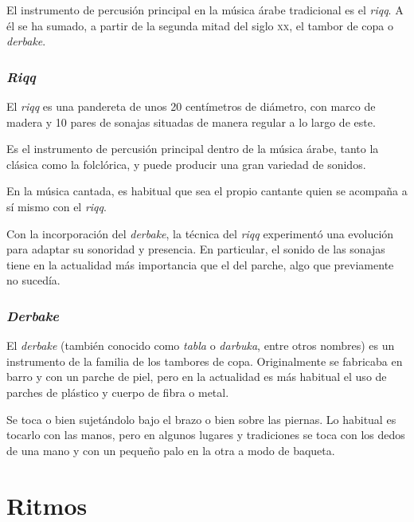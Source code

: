         El instrumento de percusión principal en la música árabe tradicional es el \emph{riqq}. A él se ha sumado, a partir de la segunda mitad del siglo \textsc{xx}, el tambor de copa o \emph{derbake}.

        \subsubsection{\emph{Riqq}}

        El \emph{riqq} es una pandereta de unos 20 centímetros de diámetro, con marco de madera y 10 pares de sonajas situadas de manera regular a lo largo de este.

        Es el instrumento de percusión principal dentro de la música árabe, tanto la clásica como la folclórica, y puede producir una gran variedad de sonidos.

        En la música cantada, es habitual que sea el propio cantante quien se acompaña a sí mismo con el \emph{riqq}.

        Con la incorporación del \emph{derbake}, la técnica del \emph{riqq} experimentó una evolución para adaptar su sonoridad y presencia. En particular, el sonido de las sonajas tiene en la actualidad más importancia que el del parche, algo que previamente no sucedía.


        \subsubsection{\emph{Derbake}}

        El \emph{derbake} (también conocido como \emph{tabla} o \emph{darbuka}, entre otros nombres) es un instrumento de la familia de los tambores de copa. Originalmente se fabricaba en barro y con un parche de piel, pero en la actualidad es más habitual el uso de parches de plástico y cuerpo de fibra o metal.

        Se toca o bien sujetándolo bajo el brazo o bien sobre las piernas. Lo habitual es tocarlo con las manos, pero en algunos lugares y tradiciones se toca con los dedos de una mano y con un pequeño palo en la otra a modo de baqueta.



\section{Ritmos}

